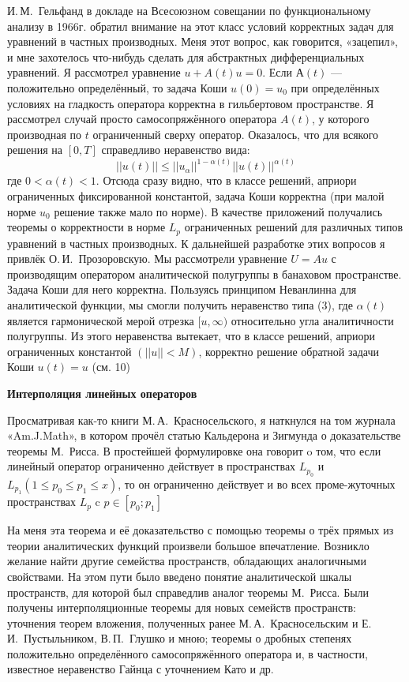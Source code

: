 И.\,М.~Гельфанд в докладе на Всесоюзном совещании по функциональному анализу в 1966г. обратил внимание на этот класс условий корректных задач для уравнений в частных производных. Меня этот вопрос, как говорится, «зацепил», и мне захотелось что-нибудь сделать для абстрактных дифференциальных уравнений. Я рассмотрел уравнение $u + A(t)u = 0$. Если $А(t)$ --- положительно определённый, то задача Коши $u(0)=u_0$ при определённых условиях на гладкость оператора корректна в гильбертовом пространстве. Я рассмотрел случай просто самосопряжённого оператора $A(t)$, у которого производная по $t$ ограниченный сверху оператор. Оказалось, что для всякого решения на $[0,T]$ справедливо неравенство вида:
$$||u(t)||\leq||u_{\alpha}||^{1-\alpha(t)} ||u(t)||^{\alpha(t)}$$
где $0<\alpha(t) < 1$.
Отсюда сразу видно, что в классе решений, априори ограниченных фиксированной константой,
задача Коши корректна (при малой норме $u_0$ решение также мало по норме).
В качестве приложений получались теоремы о корректности в норме $L_p$
ограниченных решений для различных типов уравнений в частных производных.
К дальнейшей разработке этих вопросов я привлёк О.\,И.~Прозоровскую. Мы рассмотрели уравнение $U = Au$ с производящим оператором аналитической полугруппы в банаховом пространстве. Задача Коши для него корректна. Пользуясь принципом Неванлинна для аналитической функции, мы смогли получить неравенство типа (3), где $\alpha(t)$
является гармонической мерой отрезка $[u, \infty)$  относительно угла аналитичности полугруппы. Из этого неравенства вытекает, что в классе решений, априори ограниченных константой $(||u||<M)$, корректно решение обратной задачи Коши $u(t) = u$ (см. 10)

{\bf Интерполяция линейных операторов}

Просматривая как-то книги М.\,А.~Красносельского, я наткнулся на том журнала «Am.J.Math»,
в котором прочёл статью Кальдерона и Зигмунда о доказательстве теоремы М.~Рисса.
В простейшей формулировке она говорит o том, что если линейный оператор ограниченно действует в пространствах $L_{p_0}$ и  $L_{p_1} (1\leq p_0 \leq p_1 \leq x)$, то он ограниченно действует и во всех проме-жуточных пространствах $L_p$ c $p \in [p_0;p_1]$

На меня эта теорема и её доказательство с помощью теоремы о трёх прямых из теории аналитических функций произвели большое впечатление. Возникло желание найти другие семейства пространств, обладающих аналогичными свойствами. На этом пути было введено понятие аналитической шкалы пространств, для которой был справедлив аналог теоремы М.~Рисса. Были получены интерполяционные теоремы для новых семейств пространств: уточнения теорем вложения, полученных ранее М.\,А.~Красносельским и Е.\,И.~Пустыльником, В.\,П.~Глушко и мною; теоремы о дробных степенях положительно определённого самосопряжённого оператора и, в частности, известное неравенство Гайнца с уточнением Като и др.

